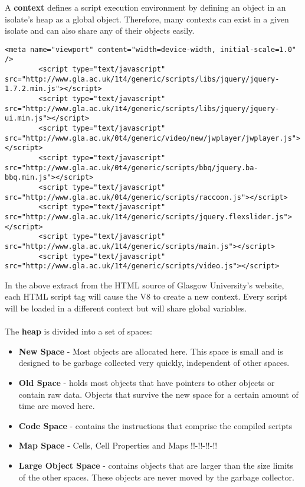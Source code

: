 \documentclass{l4proj}
\begin{document}
A \textbf{context} defines a script execution environment by defining an object in an isolate's heap as a global object. Therefore, many contexts can exist in a given isolate and can also share any of their objects easily.
\begin{lstlisting}[style=htmlcssjs]
 <meta name="viewport" content="width=device-width, initial-scale=1.0" />
        <script type="text/javascript" src="http://www.gla.ac.uk/1t4/generic/scripts/libs/jquery/jquery-1.7.2.min.js"></script>
        <script type="text/javascript" src="http://www.gla.ac.uk/1t4/generic/scripts/libs/jquery/jquery-ui.min.js"></script>
        <script type="text/javascript" src="http://www.gla.ac.uk/0t4/generic/video/new/jwplayer/jwplayer.js"></script>
        <script type="text/javascript" src="http://www.gla.ac.uk/0t4/generic/scripts/bbq/jquery.ba-bbq.min.js"></script>
        <script type="text/javascript" src="http://www.gla.ac.uk/0t4/generic/scripts/raccoon.js"></script>
        <script type="text/javascript" src="http://www.gla.ac.uk/1t4/generic/scripts/jquery.flexslider.js"></script>
        <script type="text/javascript" src="http://www.gla.ac.uk/1t4/generic/scripts/main.js"></script>
        <script type="text/javascript" src="http://www.gla.ac.uk/1t4/generic/scripts/video.js"></script>
\end{lstlisting}
In the above extract from the HTML source of Glasgow University's website, each HTML script tag will cause the V8 to create a new context. Every script will be loaded in a different context but will share global variables.\\\\
The \textbf{heap} is divided into a set of spaces:
\begin{itemize}
\item \textbf{New Space} - Most objects are allocated here. This space is small and is designed to be garbage collected very quickly, independent of other spaces. 
\item \textbf{Old Space} - holds most objects that have pointers to other objects or contain raw data. Objects that survive the new space for a certain amount of time are moved here.  
\item \textbf{Code Space} - contains the instructions that comprise the compiled scripts
\item \textbf{Map Space} - Cells, Cell Properties and Maps !!-!!-!!-!!
\item \textbf{Large Object Space} - contains objects that are larger than the size limits of the other spaces. These objects are never moved by the garbage collector.
\end{itemize}
\end{document}
